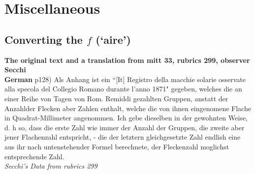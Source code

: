 \documentclass[12pt]{article}
\begin{document}
\section{Miscellaneous}

\subsection{Converting the $f$ (`aire')}\label{converting the `aire'}

\textbf{The original text and a translation from mitt 33, rubrics 299, observer Secchi}\\

\textbf{German}
p128) Als Anhang ist ein ``[It] Registro della macchie solarie osservate alla specola del Collegio Romano durante l'anno 1871" gegeben, welches die an einer Reihe von Tagen von Rom. Remiddi gezahlten Gruppen, anstatt der Anzahlder Flecken aber Zahlen enthalt, welche die von ihnen eingenomene Flache in Quadrat-Millimeter angenommen. Ich gebe dieselben in der gewohnten Weise, d. h so, dass die erste Zahl wie immer der Anzahl der Gruppen, die zweite aber jener Flachenzahl entspricht, - die der letztern gleichgesetzte Zahl endlish eine aus ihr nach untenstehender Formel berechnete, der Fleckenzahl moglichst entsprechende Zahl.\\

\textit{Secchi's Data from rubrics 299}\\
\end{document}
